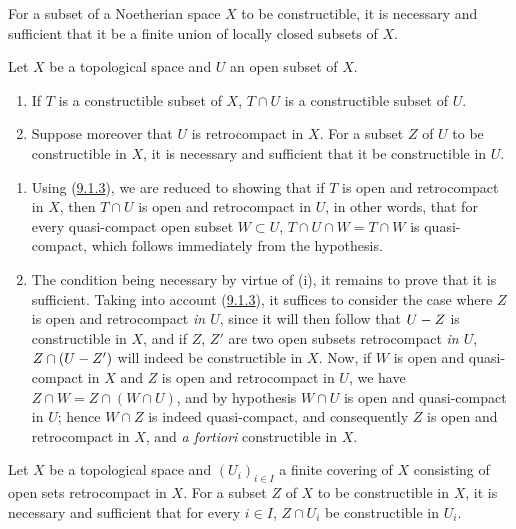 \begin{corollary}[9.1.7]
\label{0.9.1.7}
For a subset of a Noetherian space $X$ to be constructible, it is necessary
and sufficient that it be a finite union of locally closed subsets of $X$.
\end{corollary}

\begin{proposition}[9.1.8]
\label{0.9.1.8}
Let $X$ be a topological space and $U$ an open subset of $X$.
\begin{enumerate}
  \item[\textup{(i)}] If $T$ is a constructible subset of $X$, $T\cap U$ is a
    constructible subset of $U$.
  \item[\textup{(ii)}] Suppose moreover that $U$ is retrocompact in $X$. For a
    subset $Z$ of $U$ to be constructible in $X$, it is necessary and
    sufficient that it be constructible in $U$.
\end{enumerate}
\end{proposition}

\begin{enumerate}
  \item[(i)] Using (\hyperref[0.9.1.3]{9.1.3}), we are reduced to
    showing that if $T$ is open and retrocompact in $X$, then $T\cap U$ is open
    and retrocompact in $U$, in other words, that for every quasi-compact open
    subset $W\subset U$, $T\cap U\cap W=T\cap W$ is quasi-compact, which
    follows immediately from the hypothesis.
  \item[(ii)] The condition being necessary by virtue of (i), it remains
    to prove that it is sufficient. Taking into account
    (\hyperref[0.9.1.3]{9.1.3}), it suffices to consider the case where $Z$
    is open and retrocompact \emph{in $U$}, since it will then follow that
    $U- Z$ is constructible in $X$, and if $Z$, $Z'$ are two
    open subsets retrocompact \emph{in $U$},
    $Z\cap(U- Z')$ will indeed be constructible in $X$. Now, if $W$ is
    open and quasi-compact in $X$ and $Z$ is open and retrocompact in $U$, we
    have $Z\cap W=Z\cap(W\cap U)$, and by hypothesis $W\cap U$ is open and
    quasi-compact in $U$; hence $W\cap Z$ is indeed quasi-compact, and
    consequently $Z$ is open and retrocompact in $X$, and \emph{a fortiori}
    constructible in $X$.
\end{enumerate}

\begin{corollary}[9.1.9]
\label{0.9.1.9}
Let $X$ be a topological space and $(U_i)_{i\in I}$ a finite covering of
$X$ consisting of open sets retrocompact in $X$. For a subset $Z$
of $X$ to be constructible in $X$, it is necessary and sufficient that for
every $i\in I$, $Z\cap U_i$ be constructible in $U_i$.
\end{corollary}

